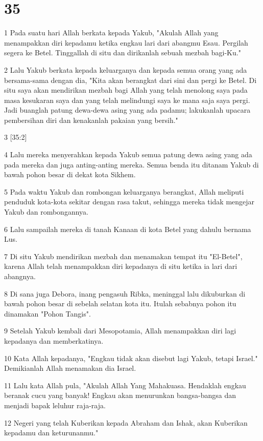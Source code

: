 \chapter{35}

\par 1 Pada suatu hari Allah berkata kepada Yakub, "Akulah Allah yang menampakkan diri kepadamu ketika engkau lari dari abangmu Esau. Pergilah segera ke Betel. Tinggallah di situ dan dirikanlah sebuah mezbah bagi-Ku."
\par 2 Lalu Yakub berkata kepada keluarganya dan kepada semua orang yang ada bersama-sama dengan dia, "Kita akan berangkat dari sini dan pergi ke Betel. Di situ saya akan mendirikan mezbah bagi Allah yang telah menolong saya pada masa kesukaran saya dan yang telah melindungi saya ke mana saja saya pergi. Jadi buanglah patung dewa-dewa asing yang ada padamu; lakukanlah upacara pembersihan diri dan kenakanlah pakaian yang bersih."
\par 3 [35:2]
\par 4 Lalu mereka menyerahkan kepada Yakub semua patung dewa asing yang ada pada mereka dan juga anting-anting mereka. Semua benda itu ditanam Yakub di bawah pohon besar di dekat kota Sikhem.
\par 5 Pada waktu Yakub dan rombongan keluarganya berangkat, Allah meliputi penduduk kota-kota sekitar dengan rasa takut, sehingga mereka tidak mengejar Yakub dan rombongannya.
\par 6 Lalu sampailah mereka di tanah Kanaan di kota Betel yang dahulu bernama Lus.
\par 7 Di situ Yakub mendirikan mezbah dan menamakan tempat itu "El-Betel", karena Allah telah menampakkan diri kepadanya di situ ketika ia lari dari abangnya.
\par 8 Di sana juga Debora, inang pengasuh Ribka, meninggal lalu dikuburkan di bawah pohon besar di sebelah selatan kota itu. Itulah sebabnya pohon itu dinamakan "Pohon Tangis".
\par 9 Setelah Yakub kembali dari Mesopotamia, Allah menampakkan diri lagi kepadanya dan memberkatinya.
\par 10 Kata Allah kepadanya, "Engkau tidak akan disebut lagi Yakub, tetapi Israel." Demikianlah Allah menamakan dia Israel.
\par 11 Lalu kata Allah pula, "Akulah Allah Yang Mahakuasa. Hendaklah engkau beranak cucu yang banyak! Engkau akan menurunkan bangsa-bangsa dan menjadi bapak leluhur raja-raja.
\par 12 Negeri yang telah Kuberikan kepada Abraham dan Ishak, akan Kuberikan kepadamu dan keturunanmu."
